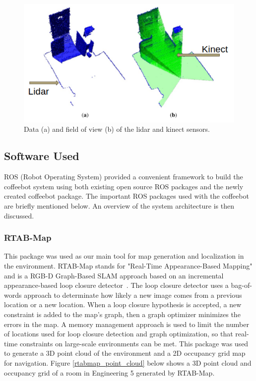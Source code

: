 \documentclass[letterpaper, 10 pt, conference]{ieeeconf}  %
\begin{document}
	\begin{figure}[!ht]
		\centering
		\includegraphics[width=1.0\columnwidth]{Figures/lidarKinect}
		\caption{Data (a) and field of view (b) of the lidar and kinect sensors.}
		\label{kinectLaser}
	\end{figure}

\subsection{Software Used}

ROS (Robot Operating System) provided a convenient framework to build the coffeebot system using both existing open source ROS packages and the newly created coffeebot package. The important ROS packages used with the coffeebot are briefly mentioned below. An overview of the system architecture is then discussed.

\subsubsection{RTAB-Map}

This package was used as our main tool for map generation and localization in the environment. RTAB-Map stands for "Real-Time Appearance-Based Mapping" and is a RGB-D Graph-Based SLAM approach based on an incremental appearance-based loop closure detector~\cite{rtabmap2014}. The loop closure detector uses a bag-of-words approach to determinate how likely a new image comes from a previous location or a new location. When a loop closure hypothesis is accepted, a new constraint is added to the map's graph, then a graph optimizer minimizes the errors in the map. A memory management approach is used to limit the number of locations used for loop closure detection and graph optimization, so that real-time constraints on large-scale environments can be met. This package was used to generate a 3D point cloud of the environment and a 2D occupancy grid map for navigation. Figure \ref{rtabmap_point_cloud} below shows a 3D point cloud and occupancy grid of a room in Engineering 5 generated by RTAB-Map.
\end{document}
